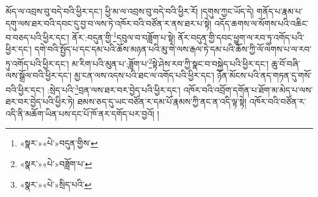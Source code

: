 མོད་ལ་འབྲས་བུ་བདེ་བའི་ཕྱིར་དང་། ཕྱི་མ་ལ་འབྲས་བུ་བདེ་བའི་ཕྱིར་རོ། །དགུས་ཀྱང་ཡོད་དེ། གནོད་པ་རྣམ་པ་དགུ་ལས་ཐར་བའི་དབང་དུ་བྱ་བ་ལས་ཏེ་འཁོར་བའི་བཙོན་ར་ནས་ཐར་པ་སྟེ། འདོད་ཆགས་ལ་སོགས་པའི་འཆིང་བ་བཅད་པའི་ཕྱིར་དང་། ནོར་:བདུན་གྱི་\footnote{«སྣར་»«པེ་»བདུན་གྱིས་}དབུལ་བ་བཟློག་པ་སྟེ། ནོར་བདུན་གྱི་དབང་ཕྱུག་ལ་རབ་ཏུ་འགོད་པའི་ཕྱིར་དང་། དགེ་བའི་སྤྱོད་པ་དང་དམ་པའི་ཆོས་མཉན་པའི་མུ་གེ་ལས་རྒལ་ཏེ་དམ་པའི་ཆོས་ཀྱི་ལོ་ལེགས་པ་ལ་རབ་ཏུ་འགོད་པའི་ཕྱིར་དང་། མ་རིག་པའི་མུན་པ་:ཟློག་པ་\footnote{«སྣར་»«པེ་»བཟློག་པ་}སྟེ་ཤེས་རབ་ཀྱི་སྣང་བ་བསྐྱེད་པའི་ཕྱིར་དང་། ཆུ་བོ་བཞི་ལས་སྒྲོལ་བའི་ཕྱིར་དང་། མྱ་ངན་ལས་འདས་པའི་ཐང་ལ་འགོད་པའི་ཕྱིར་དང་། ཉོན་མོངས་པའི་ནད་གཏན་དུ་གསོ་བའི་ཕྱིར་དང་། :སྲེད་པའི་\footnote{«སྣར་»«པེ་»སྲིད་པའི་}བྲན་ལས་ཐར་བར་བྱེད་པའི་ཕྱིར་དང་། འཁོར་བའི་འབྲོག་དགོན་པ་ཐོག་མ་མེད་པ་ལས་ཐར་བར་བྱེད་པའི་ཕྱིར་ཏེ། ཐམས་ཅད་དུ་ཡང་བཙོན་ར་དམ་པོ་རྣམས་ཀྱི་ནང་ན་འདི་ལྟ་སྟེ། འཁོར་བའི་བཙོན་ར་འདི་ནི་མཆོག་ཡིན་པས་དང་པོ་ཁོ་ནར་དགོད་པར་བྱའོ། །
